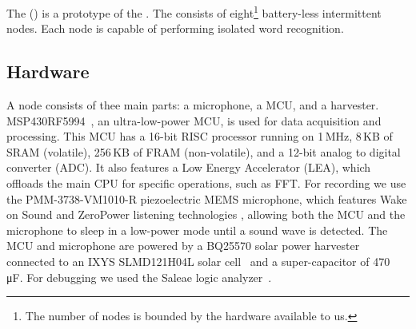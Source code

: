 The \fullcim (\cim) is a prototype of the \fullcis. The \cim consists of eight\footnote{The number of nodes is bounded by the hardware available to us.} battery-less intermittent nodes. Each node is capable of performing isolated word recognition. 
%

%
\subsection{Hardware}
\label{sec:hardware}
A \cim node consists of thee main parts: a microphone, a MCU, and a harvester. MSP430RF5994~\cite{ti_msp430_website}, an ultra-low-power MCU, is used for data acquisition and processing. This MCU has a 16-bit RISC processor running on 1\,MHz, 8\,KB of SRAM (volatile), 256\,KB of FRAM (non-volatile), and a 12-bit analog to digital converter (ADC). It also features a Low Energy Accelerator (LEA), which offloads the main CPU for specific operations, such as FFT. For recording we use the PMM-3738-VM1010-R piezoelectric MEMS microphone, which features Wake on Sound and ZeroPower listening technologies \cite{microphone}, allowing both the MCU and the microphone to sleep in a low-power mode until a sound wave is detected.
The MCU and microphone are powered by a BQ25570 solar power harvester~\cite{BQ25570EVM-206_website} connected to an IXYS SLMD121H04L solar cell~\cite{SLMD121H04L_website} and a super-capacitor of 470 \si{\micro F}. For debugging we used the Saleae logic analyzer~\cite{saleae}.
%
